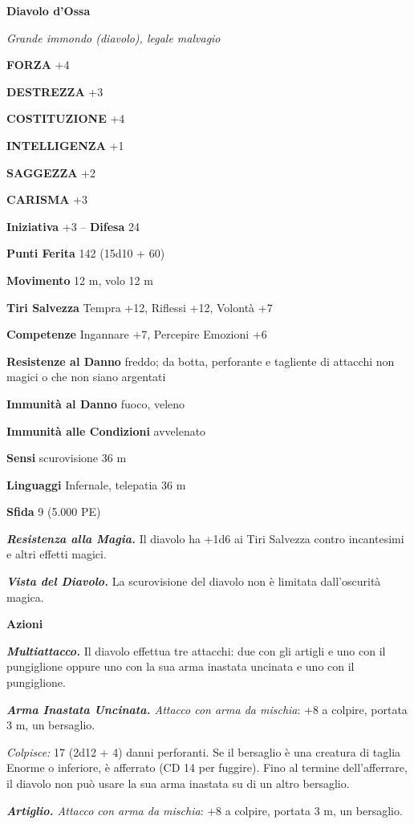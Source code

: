 \begin{multicols}{2}
\medskip{}\textbf{Diavolo d'Ossa}

\emph{Grande immondo (diavolo), legale malvagio}

\textbf{FORZA} +4

\textbf{DESTREZZA} +3

\textbf{COSTITUZIONE} +4

\textbf{INTELLIGENZA} +1

\textbf{SAGGEZZA} +2

\textbf{CARISMA} +3

\textbf{Iniziativa} +3 -- \textbf{Difesa} 24

\textbf{Punti Ferita} 142 (15d10 + 60)

\textbf{Movimento} 12 m, volo 12 m

\textbf{Tiri Salvezza} Tempra +12, Riflessi +12, Volontà +7

\textbf{Competenze} Ingannare +7, Percepire Emozioni +6

\textbf{Resistenze al Danno} freddo; da botta, perforante e tagliente di attacchi non magici o che non siano argentati

\textbf{Immunità al Danno} fuoco, veleno

\textbf{Immunità alle Condizioni} avvelenato

\textbf{Sensi} scurovisione 36 m

\textbf{Linguaggi} Infernale, telepatia 36 m 

\textbf{Sfida} 9 (5.000 PE)

\emph{\textbf{Resistenza alla Magia.}} Il diavolo ha +1d6 ai Tiri Salvezza contro incantesimi e altri effetti magici.

\emph{\textbf{Vista del Diavolo.}} La scurovisione del diavolo non è limitata dall'oscurità magica.

\textbf{Azioni}

\emph{\textbf{Multiattacco.}} Il diavolo effettua tre attacchi: due con gli artigli e uno con il pungiglione oppure uno con la sua arma inastata uncinata e uno con il pungiglione.

\emph{\textbf{Arma Inastata Uncinata.} Attacco con arma da mischia}: +8 a colpire, portata 3 m, un bersaglio.

\emph{Colpisce:} 17 (2d12 + 4) danni perforanti. Se il bersaglio è una creatura di taglia Enorme o inferiore, è afferrato (CD 14 per fuggire). Fino al termine dell'afferrare, il diavolo non può usare la sua arma inastata su di un altro bersaglio.

\emph{\textbf{Artiglio.} Attacco con arma da mischia}: +8 a colpire, portata 3 m, un bersaglio.


\end{multicols}
